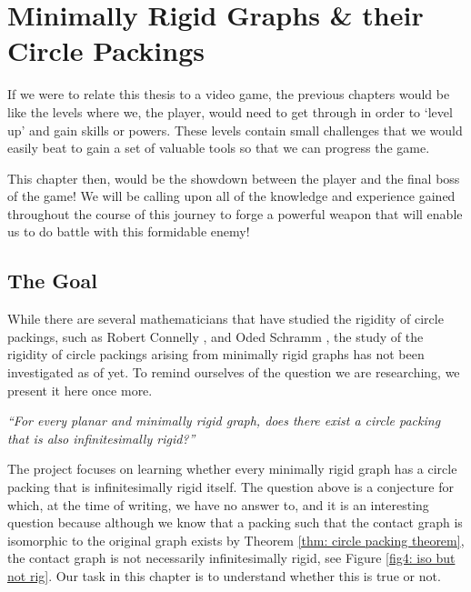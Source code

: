 \chapter{Minimally Rigid Graphs \& their Circle Packings} 
\label{ch: 4}

\begin{flushleft}
If we were to relate this thesis to a video game, the previous chapters would be like the levels where we, the player, would need to get through in order to `level up' and gain skills or powers. These levels contain small challenges that we would easily beat to gain a set of valuable tools so that we can progress the game.    
\end{flushleft}

\begin{flushleft}
This chapter then, would be the showdown between the player and the final boss of the game! We will be calling upon all of the knowledge and experience gained throughout the course of this journey to forge a powerful weapon that will enable us to do battle with this formidable enemy!
\end{flushleft}

\section{The Goal}

\begin{flushleft}
While there are several mathematicians that have studied the rigidity of circle packings, such as Robert Connelly \cite{connely}, and Oded Schramm \cite{schramm}, the study of the rigidity of circle packings arising from minimally rigid graphs has not been investigated as of yet. To remind ourselves of the question we are researching, we present it here once more. 

\begin{center}
    \textit{``For every planar and minimally rigid graph, does there exist a circle packing that is also infinitesimally rigid?''}
\end{center}

The project focuses on learning whether every minimally rigid graph has a circle packing that is infinitesimally rigid itself. The question above is a conjecture for which, at the time of writing, we have no answer to, and it is an interesting question because although we know that a packing such that the contact graph is isomorphic to the original graph exists by Theorem \ref{thm: circle packing theorem}, the contact graph is not necessarily infinitesimally rigid, see Figure \ref{fig4: iso but not rig}. Our task in this chapter is to understand whether this is true or not. 
\end{flushleft}

